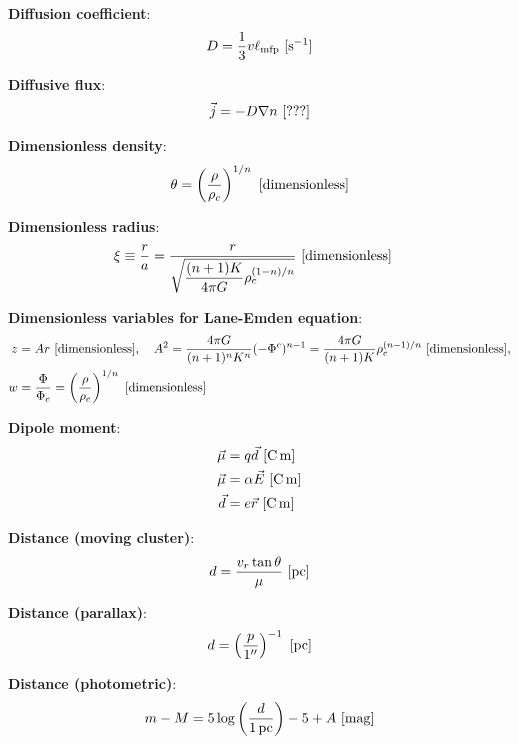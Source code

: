 \documentclass[a4paper,10pt]{article}
\begin{document}
{\noindent}\textbf{Diffusion coefficient}:
\begin{align*}
    D = \frac{1}{3}v\ell_{\rm mfp} ~ [{\rm s^{-1}}]
\end{align*}

{\noindent}\textbf{Diffusive flux}:
\begin{align*}
    \vec{j} = -D\nabla n ~ [{\rm ???}]
\end{align*}

{\noindent}\textbf{Dimensionless density}:
\begin{align*}
    \theta = \left(\frac{\rho}{\rho_c}\right)^{1/n} ~ [{\rm dimensionless}]
\end{align*}

{\noindent}\textbf{Dimensionless radius}:
\begin{align*}
    \xi &\equiv \frac{r}{a} = \frac{r}{\sqrt{\dfrac{(n+1)K}{4\pi G}\rho_c^{(1-n)/n}}} ~ [{\rm dimensionless}]
\end{align*}

{\noindent}\textbf{Dimensionless variables for Lane-Emden equation}:
\begin{align*}
    z &= Ar ~ [{\rm dimensionless}], ~~~ A^2 = \frac{4\pi G}{(n+1)^nK^n}(-\Phi^c)^{n-1} = \frac{4\pi G}{(n+1)K}\rho_c^{(n-1)/n} ~ [{\rm dimensionless}],\\
    w &= \frac{\Phi}{\Phi_c} = \left(\frac{\rho}{\rho_c}\right)^{1/n} ~ [{\rm dimensionless}]
\end{align*}

{\noindent}\textbf{Dipole moment}:
\begin{align*}
    \vec{\mu} &= q\vec{d} ~ [{\rm C\,m}] \\
    \vec{\mu} &= \alpha\vec{E} ~ [{\rm C\,m}] \\
    \vec{d} &= e\vec{r} ~ [{\rm C\,m}]
\end{align*}

{\noindent}\textbf{Distance (moving cluster)}:
\begin{align*}
    d = \frac{v_r\tan\theta}{\mu} ~ [{\rm pc}]
\end{align*}

{\noindent}\textbf{Distance (parallax)}:
\begin{align*}
    d = \left(\frac{p}{1''}\right)^{-1} ~ {[\rm pc]}
\end{align*}

{\noindent}\textbf{Distance (photometric)}:
\begin{align*}
    m-M = 5\log\left(\frac{d}{1\,{\rm pc}}\right)-5+A ~ [{\rm mag}]
\end{align*}
\end{document}
